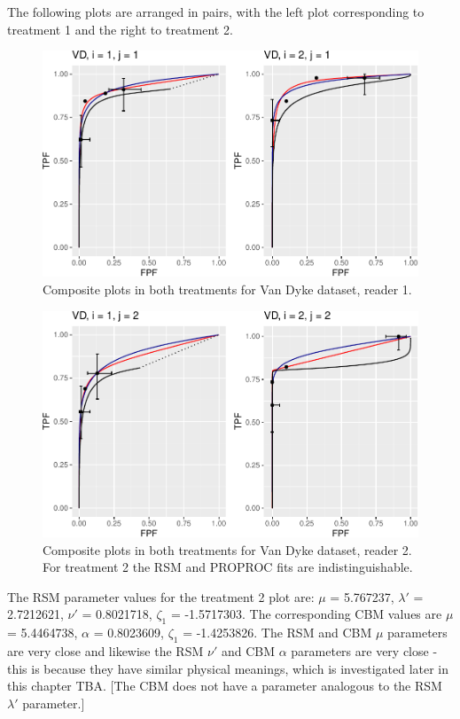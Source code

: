 \documentclass[
]{book}
\begin{document}
The following plots are arranged in pairs, with the left plot corresponding to treatment 1 and the right to treatment 2.

\begin{figure}
\centering
\includegraphics{19b-rsm-3-fits_files/figure-latex/rsm-3-fits-plots-1-1-1.pdf}
\caption{\label{fig:rsm-3-fits-plots-1-1}Composite plots in both treatments for Van Dyke dataset, reader 1.}
\end{figure}

\begin{figure}
\centering
\includegraphics{19b-rsm-3-fits_files/figure-latex/rsm-3-fits-plots-1-2-1.pdf}
\caption{\label{fig:rsm-3-fits-plots-1-2}Composite plots in both treatments for Van Dyke dataset, reader 2. For treatment 2 the RSM and PROPROC fits are indistinguishable.}
\end{figure}

The RSM parameter values for the treatment 2 plot are: \(\mu\) = 5.767237, \(\lambda'\) = 2.7212621, \(\nu'\) = 0.8021718, \(\zeta_1\) = -1.5717303. The corresponding CBM values are \(\mu\) = 5.4464738, \(\alpha\) = 0.8023609, \(\zeta_1\) = -1.4253826. The RSM and CBM \(\mu\) parameters are very close and likewise the RSM \(\nu'\) and CBM \(\alpha\) parameters are very close - this is because they have similar physical meanings, which is investigated later in this chapter TBA. {[}The CBM does not have a parameter analogous to the RSM \(\lambda'\) parameter.{]}
\end{document}
